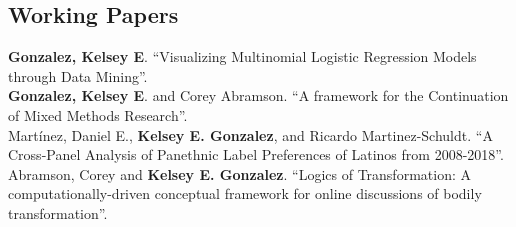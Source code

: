 \subsection*{Working Papers}

\years{} \textbf{Gonzalez, Kelsey E}. ``Visualizing Multinomial Logistic Regression Models through Data Mining''.
 \\

\years{}  \textbf{Gonzalez, Kelsey E}. and Corey Abramson. ``A framework for the Continuation of Mixed Methods Research''. 
 \\

\years{} Martínez, Daniel E., \textbf{Kelsey E. Gonzalez}, and Ricardo Martinez-Schuldt. ``A  Cross-Panel Analysis of Panethnic Label Preferences of Latinos from 2008-2018''.
 \\

\years{} Abramson, Corey and \textbf{Kelsey E. Gonzalez}. ``Logics of Transformation: A computationally-driven conceptual framework for online discussions of bodily transformation''.
